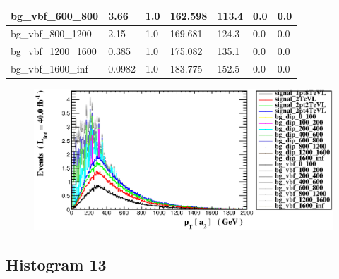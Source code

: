 \documentclass[a4paper, 10pt]{article}
\begin{document}
\begin{table}[H]
\begin{center}
\begin{tabular}{|m{23.0mm}|m{23.0mm}|m{18.0mm}|m{19.0mm}|m{19.0mm}|m{19.0mm}|m{19.0mm}|}
      \hline
      {\cellcolor{white}         bg\_vbf\_600\_800}& {\cellcolor{white}         3.66}& {\cellcolor{white}         1.0}& {\cellcolor{white}         162.598}& {\cellcolor{white}         113.4}& {\cellcolor{green}         0.0}& {\cellcolor{green}         0.0}\\
      \hline
      {\cellcolor{white}         bg\_vbf\_800\_1200}& {\cellcolor{white}         2.15}& {\cellcolor{white}         1.0}& {\cellcolor{white}         169.681}& {\cellcolor{white}         124.3}& {\cellcolor{green}         0.0}& {\cellcolor{green}         0.0}\\
      \hline
      {\cellcolor{white}         bg\_vbf\_1200\_1600}& {\cellcolor{white}         0.385}& {\cellcolor{white}         1.0}& {\cellcolor{white}         175.082}& {\cellcolor{white}         135.1}& {\cellcolor{green}         0.0}& {\cellcolor{green}         0.0}\\
      \hline
      {\cellcolor{white}         bg\_vbf\_1600\_inf}& {\cellcolor{white}         0.0982}& {\cellcolor{white}         1.0}& {\cellcolor{white}         183.775}& {\cellcolor{white}         152.5}& {\cellcolor{green}         0.0}& {\cellcolor{green}         0.0}\\
\hline
    \end{tabular}
  \end{center}
\end{table}

\begin{figure}[H]
  \begin{center}
    \includegraphics[scale=0.45]{selection_11.eps}\\
\caption{   }
  \end{center}
\end{figure}
      \newpage
\subsection{ Histogram 13}
\end{document}
